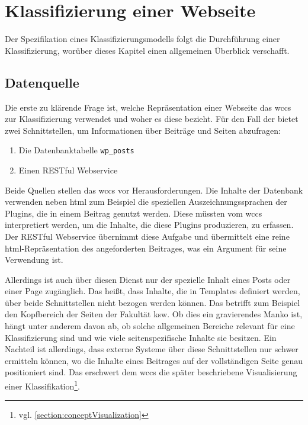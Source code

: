 \section{Klassifizierung einer Webseite}
    \label{section:conceptClassification}
    Der Spezifikation eines Klassifizierungsmodells folgt die Durchführung einer Klassifizierung,
    worüber dieses Kapitel einen allgemeinen Überblick verschafft.

    \subsection{Datenquelle}
        \label{section:conceptClassificationDataSource}
        Die erste zu klärende Frage ist, welche Repräsentation einer Webseite
        das \gls{wccs} zur Klassifizierung verwendet und woher es diese bezieht.
        Für den Fall der {\fernUni} bietet {\wordpress} zwei Schnittstellen,
        um Informationen über Beiträge und Seiten abzufragen:

        \begin{enumerate}
            \item Die Datenbanktabelle \texttt{wp\_posts} \cite{wordpress:Database}
            \item Einen RESTful Webservice \cite{wordpress:RestAPI}
        \end{enumerate}

        Beide Quellen stellen das \gls{wccs} vor Herausforderungen.
        Die Inhalte der Datenbank verwenden neben \gls{html} zum Beispiel die speziellen
        Auszeichnungssprachen der Plugins, die in einem Beitrag genutzt werden.
        Diese müssten vom \gls{wccs} interpretiert werden,
        um die Inhalte, die diese Plugins produzieren, zu erfassen.
        Der RESTful Webservice übernimmt diese Aufgabe und übermittelt
        eine reine \gls{html}-Repräsentation des angeforderten Beitrages,
        was ein Argument für seine Verwendung ist.

        Allerdings ist auch über diesen Dienst nur der spezielle Inhalt eines
        Posts oder einer Page zugänglich.
        Das heißt, dass Inhalte, die in Templates definiert werden, über beide
        Schnittstellen nicht bezogen werden können.
        Das betrifft zum Beispiel den Kopfbereich der Seiten der Fakultät \gls{ksw}.
        Ob dies ein gravierendes Manko ist, hängt unter anderem davon ab,
        ob solche allgemeinen Bereiche relevant für eine Klassifizierung sind
        und wie viele seitenspezifische Inhalte sie besitzen.
        Ein Nachteil ist allerdings, dass externe Systeme über diese Schnittstellen
        nur schwer ermitteln können, wo die Inhalte eines Beitrages auf der vollständigen Seite genau positioniert sind.
        Das erschwert dem \gls{wccs} die später beschriebene Visualisierung einer
        Klassifikation\footnote{vgl. \ref{section:conceptVisualization}}.       

